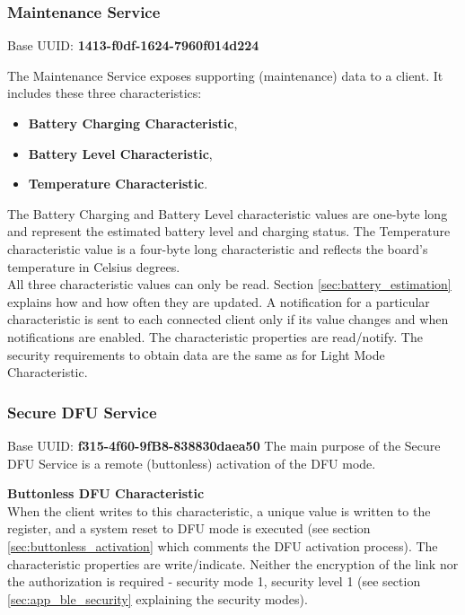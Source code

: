             
        \subsubsection{Maintenance Service}
            Base UUID: \textbf{1413-f0df-1624-7960f014d224}
            
            The Maintenance Service exposes supporting (maintenance) data to a client. It includes these three characteristics:
            \begin{itemize}
            \setlength\itemsep{0.2em} 
                \item \textbf{Battery Charging Characteristic},
                \item \textbf{Battery Level Characteristic},
                \item \textbf{Temperature Characteristic}.
            \end{itemize}
            
            The Battery Charging and Battery Level characteristic values are one-byte long and represent the estimated battery level and charging status.
            The Temperature characteristic value is a four-byte long characteristic and reflects the board's temperature in Celsius degrees.\\
            All three characteristic values can only be read. Section \ref{sec:battery_estimation} explains how and how often they are updated.
            A notification for a particular characteristic is sent to each connected client only if its value changes and when notifications are enabled.
            The characteristic properties are read/notify. The security requirements to obtain data are the same as for Light Mode Characteristic.
            
        \subsubsection{Secure DFU Service}
        
            Base UUID: \textbf{f315-4f60-9fB8-838830daea50}
            The main purpose of the Secure DFU Service is a remote (buttonless) activation of the DFU mode. 
            
            \textbf{Buttonless DFU Characteristic}\\
            When the client writes to this characteristic, a unique value is written to the  register, and a system reset to DFU mode is executed (see section \ref{sec:buttonless_activation} which comments the DFU activation process).
            The characteristic properties are write/indicate. Neither the encryption of the link nor the authorization is required - security mode 1, security level 1 (see section \ref{sec:app_ble_security} explaining the security modes).
        
